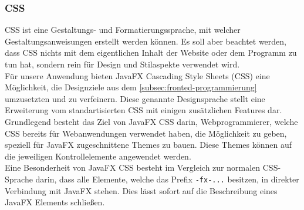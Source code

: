 \subsubsection{CSS}\label{sssec:CSS}
CSS ist eine Gestaltungs- und Formatierungssprache, mit welcher Gestaltungsanweisungen erstellt werden können.
Es soll aber beachtet werden, dass CSS nichts mit dem eigentlichen Inhalt der Website oder dem Programm zu tun hat, sondern rein für Design und Stilaspekte verwendet wird.\\
 Für unsere Anwendung bieten JavaFX Cascading Style Sheets (CSS) eine Möglichkeit, die Designziele aus dem \autoref{subsec:fronted-programmierung} umzusetzten und zu verfeinern.
Diese genannte Designsprache stellt eine Erweiterung vom standartisierten CSS mit einigen zusätzlichen Features dar.\\
Grundlegend besteht das Ziel von JavaFX CSS darin, Webprogrammierer, welche CSS bereits für Webanwendungen verwendet haben, die Möglichkeit zu geben, speziell für JavaFX zugeschnittene Themes zu bauen.
Diese Themes können auf die jeweiligen Kontrollelemente angewendet werden.\\
Eine Besonderheit von JavaFX CSS besteht im Vergleich zur normalen CSS-Sprache darin, dass alle Elemente, welche das Prefix \lstinline{-fx-...} besitzen, in direkter Verbindung mit JavaFX stehen.
Dies lässt sofort auf die Beschreibung eines JavaFX Elements schließen.
